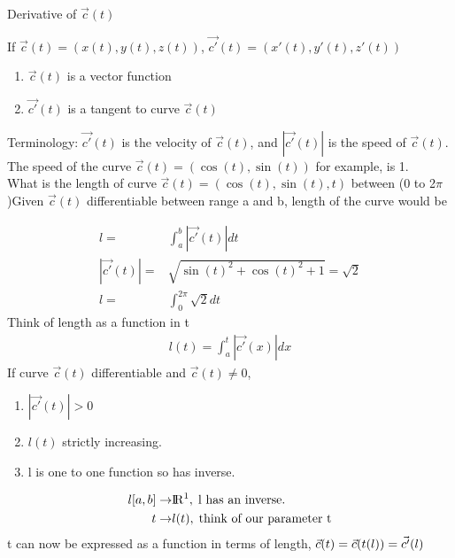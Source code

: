 \documentclass{article}
\newcommand{\R}{\rm I\!R}
\begin{document}
        Derivative of $\vec{c}(t)$
        
        If $\vec{c}(t) = (x(t),y(t),z(t))$, $\vec{c'}(t) = (x'(t),y'(t),z'(t))$
        
        \begin{enumerate}
            \item $\vec{c}(t)$ is a vector function
            \item $\vec{c'}(t)$ is a tangent to curve $\vec{c}(t)$
        \end{enumerate}
        
        Terminology: $\vec{c'}(t)$ is the velocity of $\vec{c}(t)$, and $|\vec{c'}(t)|$ is the speed of $\vec{c}(t)$. The speed of the curve $\vec{c}(t) = (\cos(t), \sin(t))$ for example, is 1.\\
        
        What is the length of curve $\vec{c}(t) = (\cos(t),\sin(t),t)$ between (0 to 2$\pi$)Given $\vec{c}(t)$ differentiable between range a and b, length of the curve would be
        
        \begin{align}
            l =& \int^{b}_{a}{|\vec{c'}(t)|}dt\\
            |\vec{c'}(t)| =& \sqrt{\sin(t)^2 + \cos(t)^2 + 1} = \sqrt{2}\\
            l =& \int^{2\pi}_{0}{\sqrt{2}dt}
        \end{align}
        Think of length as a function in t
        \begin{align}
            l(t) = \int^{t}_{a}{|\vec{c'}(x)|}dx
        \end{align}
        If curve $\vec{c}(t)$ differentiable and $\vec{c}(t) \neq 0$,
        \begin{enumerate}
            \item $|\vec{c'}(t)| > 0$
            \item $l(t)$ strictly increasing.
            \item l is one to one function so has inverse.
        \end{enumerate}
        \begin{align}
            l[a,b] \rightarrow& \R^1,\text{\;l has an inverse.}\\
            t\rightarrow& l(t),\text{\;think of our parameter t}\\
        \end{align}
        t can now be expressed as a function in terms of length, $\vec{c}(t) = \vec{c}(t(l)) = \vec{c'}(l)\\$
        
\end{document}
